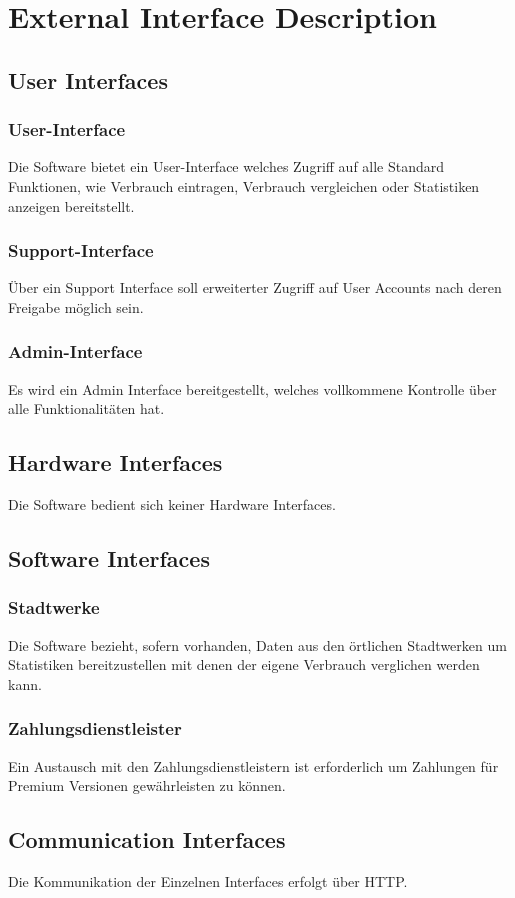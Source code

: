 \section{External Interface Description}
\subsection{User Interfaces}
\subsubsection{User-Interface}
Die Software bietet ein User-Interface welches Zugriff auf alle Standard Funktionen, wie Verbrauch eintragen, Verbrauch vergleichen oder Statistiken anzeigen bereitstellt.
\subsubsection{Support-Interface}
Über ein Support Interface soll erweiterter Zugriff auf User Accounts nach deren Freigabe möglich sein.
\subsubsection{Admin-Interface}
Es wird ein Admin Interface bereitgestellt, welches vollkommene Kontrolle über alle Funktionalitäten hat.
\subsection{Hardware Interfaces}
Die Software bedient sich keiner Hardware Interfaces.
\subsection{Software Interfaces}
\subsubsection{Stadtwerke}
Die Software bezieht, sofern vorhanden, Daten aus den örtlichen Stadtwerken um Statistiken bereitzustellen mit denen der eigene Verbrauch verglichen werden kann.
\subsubsection{Zahlungsdienstleister}
Ein Austausch mit den Zahlungsdienstleistern ist erforderlich um Zahlungen für Premium Versionen gewährleisten zu können.
\subsection{Communication Interfaces}
Die Kommunikation der Einzelnen Interfaces erfolgt über HTTP.